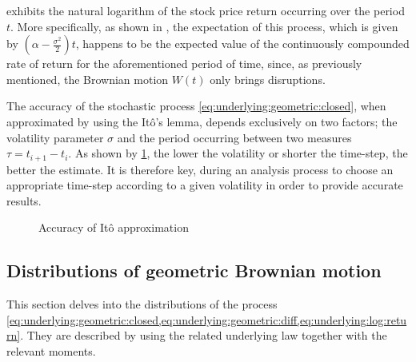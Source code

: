 \documentclass[a4paper, 12pt]{report}
\newcommand{\Bm}{W\left(t\right)}
\begin{document}
 exhibits the natural logarithm of the stock price return occurring over the period $t$. 
More specifically,  as shown in \citet{hull}, the expectation of this process, which is given by $(\alpha - \frac{\sigma ^2}{2})  t$, happens to be the expected value of the continuously compounded rate of return for the aforementioned period of time, since, as previously mentioned, the Brownian motion $\Bm$ only brings disruptions.


The accuracy of the stochastic process \ref{eq:underlying:geometric:closed}, when approximated by using the Itô's lemma, depends exclusively on two factors; the volatility parameter $\sigma$ and the period occurring between two measures $\tau = t_{i+1} - t_i$. 
As shown by \cref{p:itoaccuracy}, the lower the volatility or shorter the time-step, the better the estimate.
It is therefore key, during an analysis process to choose an appropriate time-step according to a given volatility in order to provide accurate results.


\begin{figure}[h]
\centering

\caption{Accuracy of Itô approximation}
\label{p:itoaccuracy}
\end{figure}




\subsection{Distributions of geometric Brownian motion}
\label{sub:Distribution of the stock price process}

This section delves into the distributions of the process \ref{eq:underlying:geometric:closed,eq:underlying:geometric:diff,eq:underlying:log:return}. 
They are described by using the related underlying law together with the relevant moments.
\end{document}
